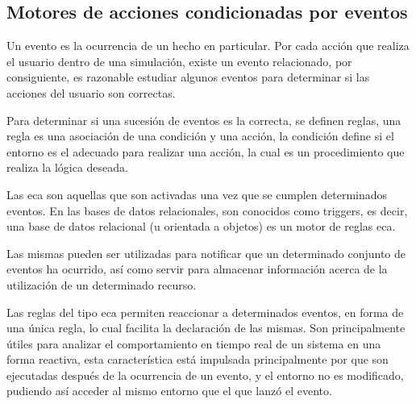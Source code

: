 

\subsection{Motores de acciones condicionadas por eventos}
\label{sec:eca}

Un evento es la ocurrencia de un hecho en particular. Por cada acción que realiza el usuario dentro  de una simulación, existe un evento relacionado, por consiguiente, es razonable  estudiar algunos eventos para determinar si las acciones del usuario son correctas.

Para determinar si una sucesión de eventos es la correcta, se definen reglas, una regla es una asociación de una condición y una acción, la condición define si el entorno es el adecuado para realizar una acción, la cual es un procedimiento que realiza la lógica deseada.

Las \gls{eca} son aquellas que son activadas una vez que se cumplen determinados eventos\cite{bailey2004event}. En las bases de datos relacionales, son conocidos como triggers, es decir, una base de datos relacional (u orientada a objetos) es un motor de reglas \gls{eca}\cite{bailey2004event,behrends2006combining}.

Las mismas pueden ser utilizadas para notificar que un determinado conjunto de eventos ha ocurrido\cite{bailey2004event}, así como servir para almacenar información acerca de la utilización de un determinado recurso.



Las reglas del tipo \gls{eca} permiten reaccionar a determinados eventos, en forma de una única regla, lo cual facilita la declaración de las mismas\cite{bailey2004event}.  Son principalmente útiles para analizar el comportamiento en tiempo real de un sistema en una forma reactiva\cite{bailey2004event,de2001eca,bailey2002analysis},  esta característica está impulsada principalmente por que son ejecutadas después  de la ocurrencia de un evento, y el entorno no es modificado, pudiendo así acceder  al mismo entorno que el que lanzó el evento.



